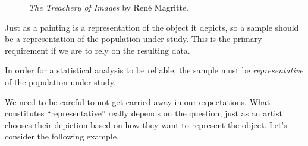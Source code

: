 \documentclass[
  letterpaper,
  DIV=11,
  numbers=noendperiod]{scrreprt}
\theoremstyle{definition}
\theoremstyle{definition}
\theoremstyle{plain}
\theoremstyle{remark}
\begin{document}
\begin{figure}


\caption{\label{fig-data-pipe-img}\emph{The Treachery of Images} by René
Magritte.}

\end{figure}%

Just as a painting is a representation of the object it depicts, so a
sample should be a representation of the population under study. This is
the primary requirement if we are to rely on the resulting data.

\begin{tcolorbox}[enhanced jigsaw, colbacktitle=quarto-callout-tip-color!10!white, colback=white, left=2mm, title=\textcolor{quarto-callout-tip-color}{\faLightbulb}\hspace{0.5em}{Big Idea}, toptitle=1mm, leftrule=.75mm, breakable, bottomrule=.15mm, arc=.35mm, rightrule=.15mm, toprule=.15mm, coltitle=black, opacityback=0, colframe=quarto-callout-tip-color-frame, opacitybacktitle=0.6, bottomtitle=1mm, titlerule=0mm]

In order for a statistical analysis to be reliable, the sample must be
\emph{representative} of the population under study.

\end{tcolorbox}

We need to be careful to not get carried away in our expectations. What
constitutes ``representative'' really depends on the question, just as
an artist chooses their depiction based on how they want to represent
the object. Let's consider the following example.
\end{document}
